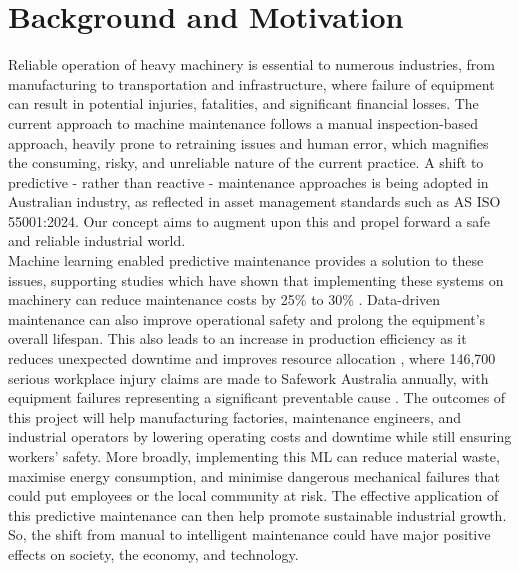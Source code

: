 \documentclass[11pt]{article}
\begin{document}


\section {Background and Motivation}

Reliable operation of heavy machinery is essential to numerous industries, from manufacturing to transportation and infrastructure, where failure of equipment can result in potential injuries, fatalities, and significant financial losses. The current approach to machine maintenance follows a manual inspection-based approach, heavily prone to retraining issues and human error, which magnifies the consuming, risky, and unreliable nature of the current practice. A shift to predictive - rather than reactive - maintenance approaches is being adopted in Australian industry, as reflected in asset management standards such as AS ISO 55001:2024. Our concept aims to augment upon this and propel forward a safe and reliable industrial world.\\

Machine learning enabled predictive maintenance provides a solution to these issues, supporting studies which have shown that implementing these systems on machinery can reduce maintenance costs by 25\% to 30\% \cite{Fernandes2022}. Data-driven maintenance can also improve operational safety and prolong the equipment's overall lifespan. This also leads to an increase in production efficiency as it reduces unexpected downtime and improves resource allocation \cite{Lei2020}, where 146,700 serious workplace injury claims are made to Safework Australia annually, with equipment failures representing a significant preventable cause \cite{safeworkaustralia2025}. The outcomes of this project will help manufacturing factories, maintenance engineers, and industrial operators by lowering operating costs and downtime while still ensuring workers' safety. More broadly, implementing this ML can reduce material waste, maximise energy consumption, and minimise dangerous mechanical failures that could put employees or the local community at risk. The effective application of this predictive maintenance can then help promote sustainable industrial growth. So, the shift from manual to intelligent maintenance could have major positive effects on society, the economy, and technology.
\end{document}
